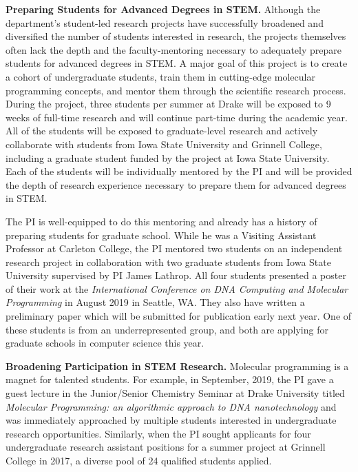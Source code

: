 \documentclass[11pt]{article}
\begin{document}
    \textbf{Preparing Students for Advanced Degrees in STEM.}
    Although the department's student-led research projects have successfully broadened and diversified the number of students interested in research, the projects themselves often lack the depth and the faculty-mentoring necessary to adequately prepare students for advanced degrees in STEM.
    A major goal of this project is to create a cohort of undergraduate students, train them in cutting-edge molecular programming concepts, and mentor them through the scientific research process.
    During the project, three students per summer at Drake will be exposed to 9 weeks of full-time research and will continue part-time during the academic year.
    All of the students will be exposed to graduate-level research and actively collaborate with students from Iowa State University and Grinnell College, including a graduate student funded by the project at Iowa State University.
    Each of the students will be individually mentored by the PI and will be provided the depth of research experience necessary to prepare them for advanced degrees in STEM.

    The PI is well-equipped to do this mentoring and already has a history of preparing students for graduate school.
    While he was a Visiting Assistant Professor at Carleton College, the PI mentored two students on an independent research project in collaboration with two graduate students from Iowa State University supervised by PI James Lathrop.
    All four students presented a poster of their work at the \emph{International Conference on DNA Computing and Molecular Programming} in August 2019 in Seattle, WA.
    They also have written a preliminary paper which will be submitted for publication early next year.
    One of these students is from an underrepresented group, and both are applying for graduate schools in computer science this year.

    \textbf{Broadening Participation in STEM Research.}
    Molecular programming is a magnet for talented students.
    For example, in September, 2019, the PI gave a guest lecture in the Junior/Senior Chemistry Seminar at Drake University titled \emph{Molecular Programming: an algorithmic approach to DNA nanotechnology} and was immediately approached by multiple students interested in undergraduate research opportunities.
    Similarly, when the PI sought applicants for four undergraduate research assistant positions for a summer project at Grinnell College in 2017, a diverse pool of 24 qualified students applied.
\end{document}
